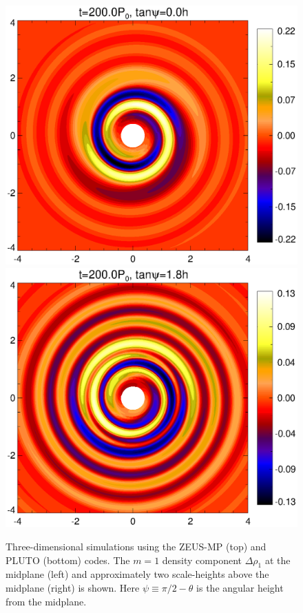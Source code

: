 \begin{figure}
\begin{center}
{      \includegraphics[scale=0.305,clip=true,trim=0cm 0cm 0cm 0cm]{figures/pdiskxy_023_z0}
      \includegraphics[scale=0.305,clip=true,trim=0.8cm 0cm 0cm
      0cm]{figures/pdiskxy_023_zmax}
    }
  \end{center}
  \caption{Three-dimensional simulations using the ZEUS-MP (top) and 
    PLUTO (bottom) codes. The $m=1$ density component $\Delta\rho_1$
    at the midplane (left) and approximately 
    two scale-heights above the midplane (right) is shown. Here $\psi
    \equiv \pi/2 - \theta$ is the angular height  
    from the midplane. \label{3d_prelim}}   
\end{figure}

